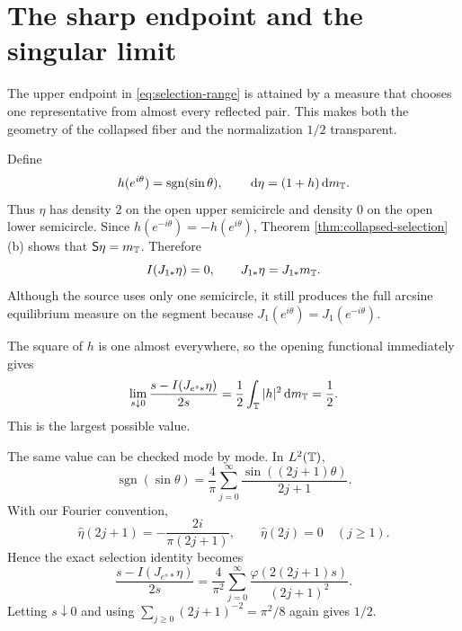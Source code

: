 \section{The sharp endpoint and the singular limit}\label{sec:example}

The upper endpoint in \eqref{eq:selection-range} is attained by a
measure that chooses one representative from almost every reflected
pair.  This makes both the geometry of the collapsed fiber and the
normalization \(1/2\) transparent.

\begin{example}\label{ex:semicircle-source}
Define
\begin{equation}\label{eq:sign-density}
 h(e^{i\theta})=\operatorname{sgn}(\sin\theta),
 \qquad
 \,\mathrm{d}\eta=(1+h)\,\mathrm{d} m_{\mathbb{T}}.
\end{equation}
Thus \(\eta\) has density \(2\) on the open upper semicircle and density
\(0\) on the open lower semicircle.  Since
\(h(e^{-i\theta})=-h(e^{i\theta})\), Theorem
\ref{thm:collapsed-selection}\textup{(b)} shows that
\(\mathsf S\eta=m_{\mathbb{T}}\).  Therefore
\[
 I(J_{1\ast}\eta)=0,
 \qquad
 J_{1\ast}\eta=J_{1\ast}m_{\mathbb{T}}.
\]
Although the source uses only one semicircle, it still produces the
full arcsine equilibrium measure on the segment because
\(J_1(e^{i\theta})=J_1(e^{-i\theta})\).

The square of \(h\) is one almost everywhere, so the opening functional
immediately gives
\begin{equation}\label{eq:sign-extremal-value}
 \lim_{s\downarrow0}
 \frac{s-I(J_{e^s\ast}\eta)}{2s}
 =\frac12\int_{\mathbb{T}}|h|^2\,\mathrm{d} m_{\mathbb{T}}
 =\frac12.
\end{equation}
This is the largest possible value.

The same value can be checked mode by mode.  In \(L^2(\mathbb{T})\),
\[
 \operatorname{sgn}(\sin\theta)
 =\frac4\pi\sum_{j=0}^{\infty}
 \frac{\sin((2j+1)\theta)}{2j+1}.
\]
With our Fourier convention,
\[
 \widehat\eta(2j+1)
 =-\frac{2i}{\pi(2j+1)},
 \qquad
 \widehat\eta(2j)=0\quad(j\geq1).
\]
Hence the exact selection identity becomes
\begin{equation}\label{eq:sign-exact-selection}
 \frac{s-I(J_{e^s\ast}\eta)}{2s}
 =\frac4{\pi^2}\sum_{j=0}^{\infty}
 \frac{\varphi(2(2j+1)s)}{(2j+1)^2}.
\end{equation}
Letting \(s\downarrow0\) and using
\(\sum_{j\geq0}(2j+1)^{-2}=\pi^2/8\) again gives \(1/2\).
\end{example}

